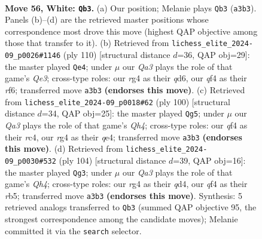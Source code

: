 \documentclass[11pt]{article}
\begin{document}
\clearpage

\begin{figure}[p]\centering
\begin{subfigure}{0.46\textwidth}\centering
\resizebox{\linewidth}{!}{%
\newchessgame
\chessboard[
  setfen={8/8/5pk1/3p4/5qr1/Q5P1/P5KP/8 w - - 6 56},
  showmover=false,
  pgfstyle=straightmove, color=movearrow, markmove={a3-b3}
]}
\caption{}
\end{subfigure}\hfill
\begin{subfigure}{0.46\textwidth}\centering
\resizebox{\linewidth}{!}{%
\newchessgame
\chessboard[
  setfen={6k1/4R3/3q1r1p/8/5PP1/4Q1KP/8/8 w - - 5 56},
  showmover=false,
  pgfstyle=straightmove, color=movearrow, markmove={e3-e4}
]}
\caption{}
\end{subfigure}
\\[4pt]
\begin{subfigure}{0.46\textwidth}\centering
\resizebox{\linewidth}{!}{%
\newchessgame
\chessboard[
  setfen={k7/p7/4p1N1/8/2r1qP1Q/7P/6PK/8 w - - 0 51},
  showmover=false,
  pgfstyle=straightmove, color=movearrow, markmove={h4-g5}
]}
\caption{}
\end{subfigure}\hfill
\begin{subfigure}{0.46\textwidth}\centering
\resizebox{\linewidth}{!}{%
\newchessgame
\chessboard[
  setfen={8/3k1p2/5p2/1r6/3q1P1Q/Rp5P/6PK/8 w - - 2 53},
  showmover=false,
  pgfstyle=straightmove, color=movearrow, markmove={h4-g3}
]}
\caption{}
\end{subfigure}
\caption{\textbf{Move 56, White: \texttt{Qb3}.} (a) Our position; Melanie plays \texttt{Qb3} (\texttt{a3b3}). Panels (b)--(d) are the retrieved master positions whose correspondence most drove this move (highest QAP objective among those that transfer to it). (b) Retrieved from \texttt{lichess\_elite\_2024-09\_p0026\#1146} (ply 110) [structural distance $d$=36, QAP obj=29]: the master played \texttt{Qe4}; under $\mu$ our \emph{Qa3} plays the role of that game's \emph{Qe3}; cross-type roles: our \emph{r}g4 as their \emph{q}d6, our \emph{q}f4 as their \emph{r}f6; transferred move \texttt{a3b3} \textbf{(endorses this move)}. (c) Retrieved from \texttt{lichess\_elite\_2024-09\_p0018\#62} (ply 100) [structural distance $d$=34, QAP obj=25]: the master played \texttt{Qg5}; under $\mu$ our \emph{Qa3} plays the role of that game's \emph{Qh4}; cross-type roles: our \emph{q}f4 as their \emph{r}c4, our \emph{r}g4 as their \emph{q}e4; transferred move \texttt{a3b3} \textbf{(endorses this move)}. (d) Retrieved from \texttt{lichess\_elite\_2024-09\_p0030\#532} (ply 104) [structural distance $d$=39, QAP obj=16]: the master played \texttt{Qg3}; under $\mu$ our \emph{Qa3} plays the role of that game's \emph{Qh4}; cross-type roles: our \emph{r}g4 as their \emph{q}d4, our \emph{q}f4 as their \emph{r}b5; transferred move \texttt{a3b3} \textbf{(endorses this move)}. Synthesis: 5 retrieved analogs transferred to \texttt{Qb3} (summed QAP objective 95, the strongest correspondence among the candidate moves); Melanie committed it via the \texttt{search} selector.}
\label{fig:thought-m110}
\end{figure}
\end{document}
